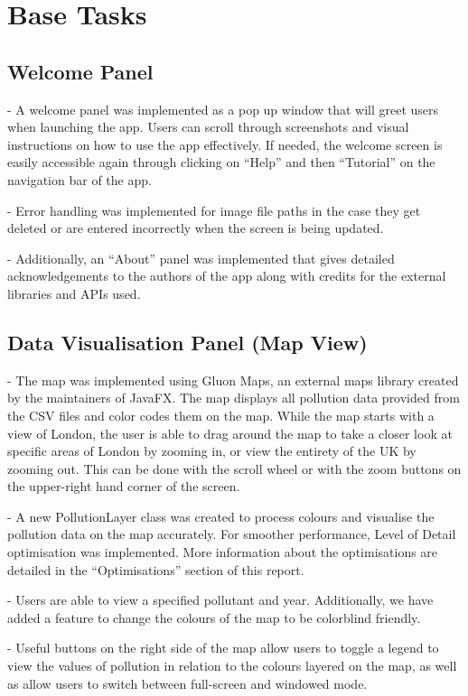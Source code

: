 \section{Base Tasks}
\subsection{Welcome Panel}
    - A welcome panel was implemented as a pop up window that will greet users when launching the app. Users can scroll through screenshots and visual instructions on how to use the app effectively. If needed, the welcome screen is easily accessible again through clicking on “Help” and then “Tutorial” on the navigation bar of the app.
    
    - Error handling was implemented for image file paths in the case they get deleted or are entered incorrectly when the screen is being updated.
    
    - Additionally, an “About” panel was implemented that gives detailed acknowledgements to the authors of the app along with credits for the external libraries and APIs used.
    
\subsection{Data Visualisation Panel (Map View)}
    - The map was implemented using Gluon Maps, an external maps library created by the maintainers of JavaFX. The map displays all pollution data provided from the CSV files and color codes them on the map. While the map starts with a view of London, the user is able to drag around the map to take a closer look at specific areas of London by zooming in, or view the entirety of the UK by zooming out. This can be done with the scroll wheel or with the zoom buttons on the upper-right hand corner of the screen.
    
    - A new PollutionLayer class was created to process colours and visualise the pollution data on the map accurately. For smoother performance, Level of Detail optimisation was implemented. More information about the optimisations are detailed in the “Optimisations” section of this report.
    
    - Users are able to view a specified pollutant and year. Additionally, we have added a feature to change the colours of the map to be colorblind friendly.
    
    - Useful buttons on the right side of the map allow users to toggle a legend to view the values of pollution in relation to the colours layered on the map, as well as allow users to switch between full-screen and windowed mode.
    
